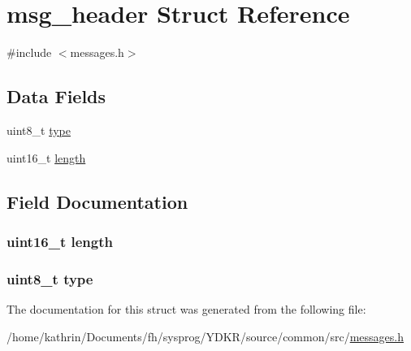 \hypertarget{structmsg__header}{
\section{msg\_\-header Struct Reference}
\label{structmsg__header}
}


{\ttfamily \#include $<$messages.h$>$}

\subsection*{Data Fields}
\begin{DoxyCompactItemize}
\item 
uint8\_\-t \hyperlink{structmsg__header_a1d127017fb298b889f4ba24752d08b8e}{type}
\item 
uint16\_\-t \hyperlink{structmsg__header_a1892eba2086d12ac2b09005aeb09ea3b}{length}
\end{DoxyCompactItemize}


\subsection{Field Documentation}
\hypertarget{structmsg__header_a1892eba2086d12ac2b09005aeb09ea3b}{
\subsubsection[{length}]{\setlength{\rightskip}{0pt plus 5cm}uint16\_\-t {\bf length}}}
\label{structmsg__header_a1892eba2086d12ac2b09005aeb09ea3b}
\hypertarget{structmsg__header_a1d127017fb298b889f4ba24752d08b8e}{
\subsubsection[{type}]{\setlength{\rightskip}{0pt plus 5cm}uint8\_\-t {\bf type}}}
\label{structmsg__header_a1d127017fb298b889f4ba24752d08b8e}


The documentation for this struct was generated from the following file:\begin{DoxyCompactItemize}
\item 
/home/kathrin/Documents/fh/sysprog/YDKR/source/common/src/\hyperlink{messages_8h}{messages.h}\end{DoxyCompactItemize}
